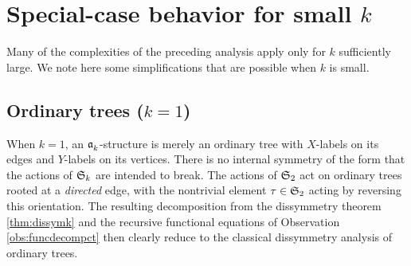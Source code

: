 \documentclass[distribution,draft]{brandiss} %
\numberwithin{section}{chapter}
\numberwithin{figure}{chapter}
\begin{document}
\section{Special-case behavior for small $k$}
Many of the complexities of the preceding analysis apply only for $k$ sufficiently large.
We note here some simplifications that are possible when $k$ is small.

\subsection{Ordinary trees ($k = 1$)}
When $k = 1$, an $\mathfrak{a}_{k}^{}$-structure is merely an ordinary tree with $X$-labels on its edges and $Y$-labels on its vertices.
There is no internal symmetry of the form that the actions of $ \mathfrak{S}_{k} $ are intended to break.
The actions of $ \mathfrak{S}_{2} $ act on ordinary trees rooted at a \emph{directed} edge, with the nontrivial element $\tau \in  \mathfrak{S}_{2} $ acting by reversing this orientation.
The resulting decomposition from the dissymmetry theorem \ref{thm:dissymk} and the recursive functional equations of Observation \ref{obs:funcdecompct} then clearly reduce to the classical dissymmetry analysis of ordinary trees.
\end{document}
